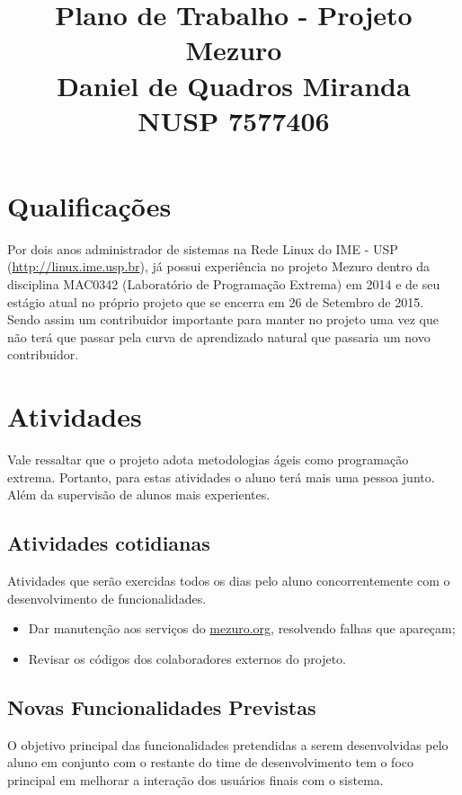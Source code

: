 \documentclass[12pt]{article}
\begin{document}
  \title{Plano de Trabalho - Projeto Mezuro\\
         Daniel de Quadros Miranda\\
         NUSP 7577406}

  \maketitle

  \section{Qualificações}
  Por dois anos administrador de sistemas na Rede Linux do IME - USP (\url{http://linux.ime.usp.br}), já possui experiência no projeto Mezuro dentro da disciplina MAC0342 (Laboratório de Programação Extrema) em 2014 e de seu estágio atual no próprio projeto que se encerra em 26 de Setembro de 2015. Sendo assim um contribuidor importante para manter no projeto uma vez que não terá que passar pela curva de aprendizado natural que passaria um novo contribuidor.

  \section{Atividades}
    Vale ressaltar que o projeto adota metodologias ágeis como programação extrema. Portanto, para estas atividades o aluno terá mais uma pessoa junto. Além da supervisão de alunos mais experientes.

    \subsection{Atividades cotidianas}
      Atividades que serão exercidas todos os dias pelo aluno concorrentemente com o desenvolvimento de funcionalidades.

      \begin{itemize}
        \item Dar manutenção aos serviços do \url{mezuro.org}, resolvendo falhas que apareçam;
        \item Revisar os códigos dos colaboradores externos do projeto.
      \end{itemize}

    \subsection{Novas Funcionalidades Previstas}\label{subsec:func-prev}
      O objetivo principal das funcionalidades pretendidas a serem desenvolvidas pelo aluno em conjunto com o restante do time de desenvolvimento tem o foco principal em melhorar a interação dos usuários finais com o sistema.
\end{document}
